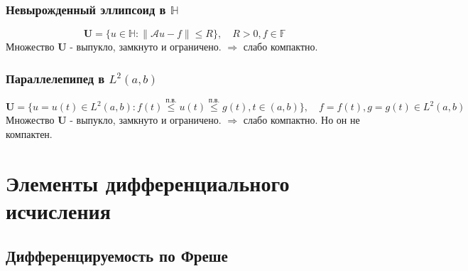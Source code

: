 \documentclass[A4]{article}
\begin{document}
\subsubsection{Невырожденный эллипсоид в $\mathbb{H}$}
\begin{equation*}
\mathbf{U}=\{u\in\mathbb{H}:\|\mathcal{A}u-f\|\leqslant R\}, \quad R>0,f\in\mathbb{F}
\end{equation*}
Множество $\mathbf{U}$ - выпукло, замкнуто и ограничено. $\Rightarrow$ слабо компактно.
\subsubsection{Параллелепипед в $L^2(a,b)$}
\begin{equation*}
\mathbf{U}=\{u=u(t)\in L^2(a,b):f(t)\stackrel{\text{п.в.}}{\leqslant}u(t)\stackrel{\text{п.в.}}{\leqslant}g(t),t\in(a,b)\},\quad f=f(t),g=g(t)\in L^2(a,b)
\end{equation*}
Множество $\mathbf{U}$ - выпукло, замкнуто и ограничено. $\Rightarrow$ слабо компактно. Но он не компактен.
\section{Элементы дифференциального исчисления}
\subsection{Дифференцируемость по Фреше}
\end{document}

